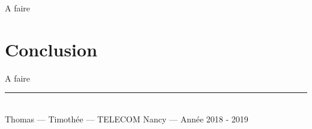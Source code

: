 \documentclass[a4paper, 11pt, twoside]{book}
\renewcommand{\tn}{TELECOM Nancy}
\begin{document}
A faire

\chapter*{Conclusion}

A faire



\printbibliography{}

\vfill

\begin{center}
\rule{0.9\linewidth}{1pt}\\
{\small
  Thomas  --- Timothée  --- \tn{} --- Année 2018 - 2019
}
\end{center}
\end{document}
